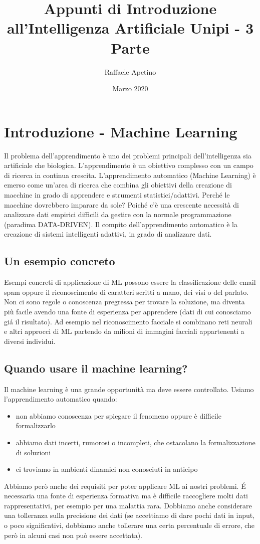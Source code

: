 \documentclass{article}
\title{Appunti di Introduzione all'Intelligenza Artificiale Unipi - 3 Parte}
\author{Raffaele Apetino}
\date{Marzo 2020}
\begin{document}
\maketitle

\tableofcontents{}
\clearpage

\section{Introduzione - Machine Learning}
Il problema dell'apprendimento è uno dei problemi principali dell'intelligenza sia artificiale che biologica. L'apprendimento è un obiettivo complesso con un campo di ricerca in continua crescita. L'apprendimento automatico (Machine Learning) è emerso come un'area di ricerca che combina gli obiettivi della creazione di macchine in grado di apprendere e strumenti statistici/adattivi. Perché le macchine dovrebbero imparare da sole? Poiché c'è una crescente necessità di analizzare dati empirici difficili da gestire con la normale programmazione (paradima DATA-DRIVEN). Il compito dell'apprendimento automatico è la creazione di sistemi intelligenti adattivi, in grado di analizzare dati.

\subsection{Un esempio concreto}
Esempi concreti di applicazione di ML possono essere la classificazione delle email spam oppure il riconoscimento di caratteri scritti a mano, dei visi o del parlato. Non ci sono regole o conoscenza pregressa per trovare la soluzione, ma diventa più facile avendo una fonte di esperienza per apprendere (dati di cui conosciamo giá il risultato). Ad esempio nel riconoscimento facciale si combinano reti neurali e altri approcci di ML partendo da milioni di immagini facciali appartenenti a diversi individui. 

\subsection{Quando usare il machine learning?}
Il machine learning è una grande opportunità ma deve essere controllato. Usiamo l'apprendimento automatico quando:
\begin{itemize}
    \item non abbiamo conoscenza per spiegare il fenomeno oppure è difficile formalizzarlo
    \item abbiamo dati incerti, rumorosi o incompleti, che ostacolano la formalizzazione di soluzioni
    \item ci troviamo in ambienti dinamici non conosciuti in anticipo
\end{itemize}
Abbiamo però anche dei requisiti per poter applicare ML ai nostri problemi. É necessaria una fonte di esperienza formativa ma è difficile raccogliere molti dati rappresentativi, per esempio per una malattia rara. Dobbiamo anche considerare una tolleranza sulla precisione dei dati (se accettiamo di dare pochi dati in input, o poco significativi, dobbiamo anche tollerare una certa percentuale di errore, che però in alcuni casi non può essere accettata).
\end{document}
